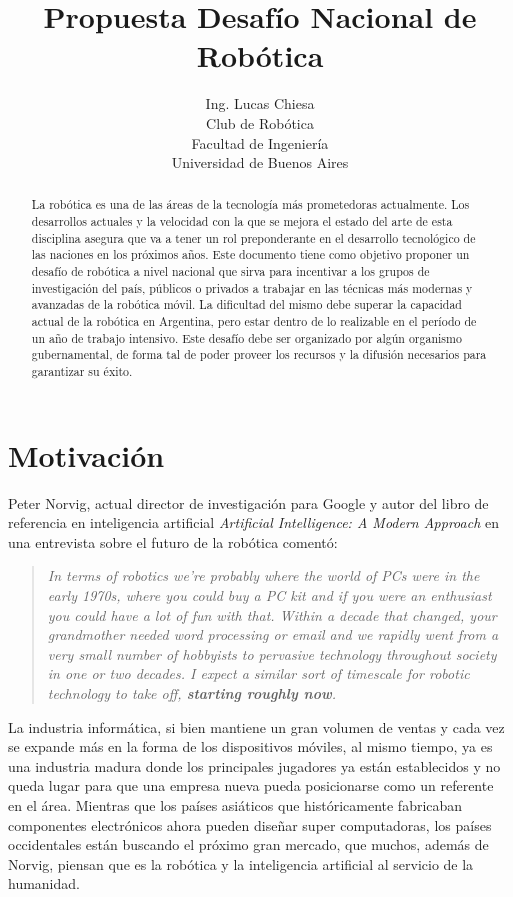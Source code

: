 \documentclass[a4paper,12pt]{article}
\author{Ing. Lucas Chiesa \\ Club de Robótica \\ Facultad de Ingeniería \\ Universidad de Buenos Aires}
\title{Propuesta Desafío Nacional de Robótica}
\begin{document}


\begin{abstract}
 La robótica es una de las áreas de la tecnología más prometedoras actualmente. Los desarrollos actuales y la velocidad con la que se mejora el estado del arte de esta disciplina asegura que va a tener un rol preponderante en el desarrollo tecnológico de las naciones en los próximos años.
 Este documento tiene como objetivo proponer un desafío de robótica a nivel nacional que sirva para incentivar a los grupos de investigación del país, públicos o privados a trabajar en las técnicas más modernas y avanzadas de la robótica móvil. La dificultad del mismo debe superar la capacidad actual de la robótica en Argentina, pero estar dentro de lo realizable en el período de un año de trabajo intensivo. Este desafío debe ser organizado por algún organismo gubernamental, de forma tal de poder proveer los recursos y la difusión necesarios para garantizar su éxito.
\end{abstract}

\newpage
\section{Motivación}

Peter Norvig\cite{norvig-cv}, actual director de investigación para Google y autor del libro de referencia en inteligencia artificial \textit{Artificial Intelligence: A Modern Approach} en una entrevista sobre el futuro de la robótica comentó\cite{norvig-cita}:

\begin{quote}
\textit{In terms of robotics we're probably where the world of PCs were in the early 1970s, where you could buy a PC kit and if you were an enthusiast you could have a lot of fun with that. Within a decade that changed, your grandmother needed word processing or email and we rapidly went from a very small number of hobbyists to pervasive technology throughout society in one or two decades. I expect a similar sort of timescale for robotic technology to take off, \textbf{starting roughly now}.}
\end{quote}

La industria informática, si bien mantiene un gran volumen de ventas y cada vez se expande más en la forma de los dispositivos móviles, al mismo tiempo, ya es una industria madura donde los principales jugadores ya están establecidos y no queda lugar para que una empresa nueva pueda posicionarse como un referente en el área. Mientras que los países asiáticos que históricamente fabricaban componentes electrónicos ahora pueden diseñar super computadoras\cite{spectrum-china}, los países occidentales están buscando el próximo gran mercado, que muchos, además de Norvig, piensan que es la robótica y la inteligencia artificial al servicio de la humanidad\cite{ros-spur}\cite{redwood}\cite{wg-irobot}.
\end{document}
